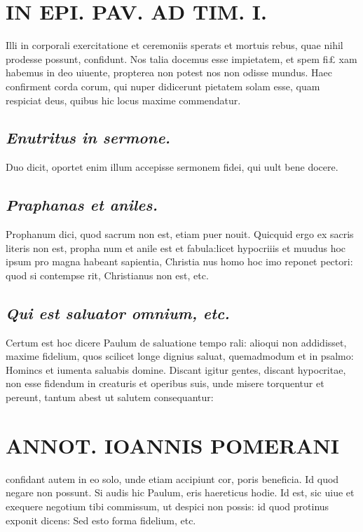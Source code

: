 \documentclass{article}
\begin{document}
\begin{pages}
\section*{IN EPI. PAV. AD TIM. I. }
\marginpar{[ p.92 ]}\pstart Illi in corporali exercitatione et ceremoniis sperats et mortuis rebus, quae nihil prodesse possunt, confidunt. Nos talia docemus esse impietatem, et spem fi£ xam habemus in deo uiuente, propterea non potest nos non odisse mundus. Haec confirment corda corum, qui nuper didicerunt pietatem solam esse, quam respiciat deus, quibus hic locus maxime commendatur.  \pend
{}
{}
\subsection*{\textit{Enutritus in sermone. }}\pstart Duo dicit, oportet enim illum accepisse sermonem fidei, qui uult bene docere.  \pend
{}
{}
\subsection*{\textit{Praphanas et aniles. }}\pstart Prophanum dici, quod sacrum non est, etiam puer nouit. Quicquid ergo ex sacris literis non est, propha num et anile est et fabula:licet hypocriiis et muudus hoc ipsum pro magna habeant sapientia, Christia nus homo hoc imo reponet pectori: quod si contempse rit, Christianus non est, etc.  \pend
{}
{}
\subsection*{\textit{Qui est saluator omnium, etc. }}\pstart Certum est hoc dicere Paulum de saluatione tempo rali: alioqui non addidisset, maxime fidelium, quos scilicet longe dignius saluat, quemadmodum et in psalmo: Homincs et iumenta saluabis domine. Discant igitur gentes, discant hypocritae, non esse fidendum in creaturis et operibus suis, unde misere torquentur et pereunt, tantum abest ut salutem consequantur:  \pend
\section*{ANNOT. IOANNIS POMERANI }\pstart confidant autem in eo solo, unde etiam accipiunt cor, poris beneficia. Id quod negare non possunt.  \pend\pstart Si audis hic Paulum, eris haereticus hodie.  \pend\pstart Id est, sic uiue et exequere negotium tibi commissum, ut despici non possis: id quod protinus exponit dicens: Sed esto forma fidelium, etc.  \pend
{}
{}

\end{pages}
\end{document}
